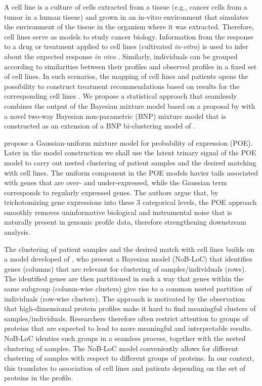 A cell line is a culture of cells extracted from a tissue (e.g.,
cancer cells from a tumor in a human tissue) and grown in an in-vitro
environment that simulates the environment of the tissue in the
organism where it was extracted. Therefore, cell lines serve as
models to study cancer biology.  Information  from the response to a
drug or treatment applied to cell lines (cultivated {\it in-vitro}) is used
to infer about the  expected response {\it in vivo}
\citep{goodspeed2016}. Similarly, individuals can be grouped
according to similarities between their profiles and observed profiles
in a fixed set of cell lines.
 In such scenarios,  the mapping of
cell lines and patients  opens the possibility to construct treatment
recommendations 
based on results for the corresponding cell lines \citep{sinha2015}. We propose a statistical  approach that seamlessly  combines the
output of the Bayesian mixture model
 based on a proposal by \cite{poe_2002} with a novel two-way Bayesian non-parametric (BNP) mixture model  that is constructed as an extension of a  BNP bi-clustering model of \cite{lee2013}. 

\cite{poe_2002} propose a Gaussian-uniform mixture model for probability of expression
 (POE). Later in the model construction we shall use the latent trinary signal of the POE model to carry out nested clustering of patient samples and the desired matching with cell lines. The uniform component in the POE models havier tails associated with genes that are over- and under-expressed, while the Gaussian term corresponds to regularly expressed genes. The authors argue that, by trichotomizing  gene expressions into these 3 categorical levels, the POE approach smoothly removes uninformative biological and instrumental noise that is naturally present in genomic profile data, therefore strengthening downstream  analysis.

The clustering of patient samples and the desired match with cell lines builds on a model developed of \cite{lee2013}, who present a Bayesian model  (NoB-LoC)  that identifies genes (columns) that are relevant for clustering of samples/individuals (rows).  The identified genes are then partitioned  in such a way that genes within the same subgroup (column-wise clusters)  give rise to a common nested partition of individuals (row-wise clusters). 
 The approach is motivated by the observation that high-dimensional protein profiles make it hard to find meaningful
clusters of samples/individuals. Researchers therefore often restrict attention to groups of proteins that are
expected to lead to more meaningful and interpretable results. NoB-LoC identies such groups in a seamless process, together with the nested clustering of samples. The NoB-LoC model conveniently allows for different clustering of samples with respect to different groups of proteins. In our context, this translates to association of cell lines and patients depending on the set of proteins in the profile.



